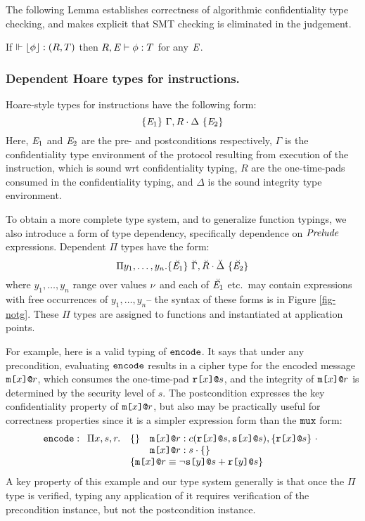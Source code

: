 The following Lemma establishes correctness of algorithmic confidentiality
type checking, and makes explicit that SMT checking is eliminated in the
judgement.
\begin{lemma}
  \label{lemma-atj-sound}
  If $\Vdash \lfloor \phi \rfloor : (R,T)$ then $R,\mathit{E} \vdash \phi : T$ for any $\mathit{E}$.
\end{lemma}

\subsubsection{Dependent Hoare types for instructions.}

Hoare-style types for instructions have the following form:
$$
\{ \mathit{E}_1 \}\ \Gamma,R \cdot \Delta\ \{ \mathit{E}_2 \}
$$
Here, $\mathit{E}_1$ and $\mathit{E}_2$ are the pre- and postconditions
respectively, $\Gamma$ is the confidentiality type environment of the
protocol resulting from execution of the instruction, which is sound
wrt confidentiality typing, $R$ are the one-time-pads consumed in the
confidentiality typing, and $\Delta$ is the sound integrity type
environment.

\notgfig

To obtain a more complete type system, and to generalize
function typings, we also introduce a form of type dependency,
specifically dependence on $\mathit{Prelude}$ expressions. Dependent
$\Pi$ types have the form:
$$
\Pi y_1,\ldots,y_n . \{ \breve{\mathit{E}_1} \}\ \breve{\Gamma},\breve{R} \cdot \breve{\Delta}\ \{ \breve{\mathit{E}_2} \}
$$
where $y_1,\ldots,y_n$ range over values $\nu$ and each of
$\breve{\mathit{E}_1}$ etc.~may contain expressions with free occurrences
of $y_1,\ldots,y_n$-- the syntax of these forms is in Figure
\ref{fig-notg}. These $\Pi$ types are assigned to functions
and instantiated at application points. 

For example, here is a valid typing of $\texttt{encode}$.  It says that
under any precondition, evaluating $\texttt{encode}$ results in a cipher
type for the encoded message $\texttt{m[}x\texttt{]}\texttt{@}r$, which consumes the
one-time-pad $\texttt{r[}x\texttt{]}\texttt{@}s$, and the integrity of $\texttt{m[}x\texttt{]}\texttt{@}r$ is
determined by the security level of $s$. The
postcondition expresses the key confidentiality property of
$\texttt{m[}x\texttt{]}\texttt{@}r$, but also may be practically useful for correctness
properties since it is a simpler expression form than the $\texttt{mux}$
form:
$$
\ttt{encode} :
\begin{array}[t]{ll}
  \Pi x,s,r . & \{ \}\quad \mx{x}{r} : \cty{\rx{x}{s}}{\sx{x}{s}}, \{ \rx{x}{s} \} \ \cdot\\
  & \phantom{\{ \}} \quad \mx{x}{r} : \ity{s}{\setit{}} \\
  & \{ \mx{x}{r} \eop \neg\sx{y}{s} \fplus \rx{y}{s} \}
\end{array}
$$
A key property of this example and our type system generally is that once
the $\Pi$ type is verified, typing any application of it requires verification
of the precondition instance, but not the postcondition instance.

